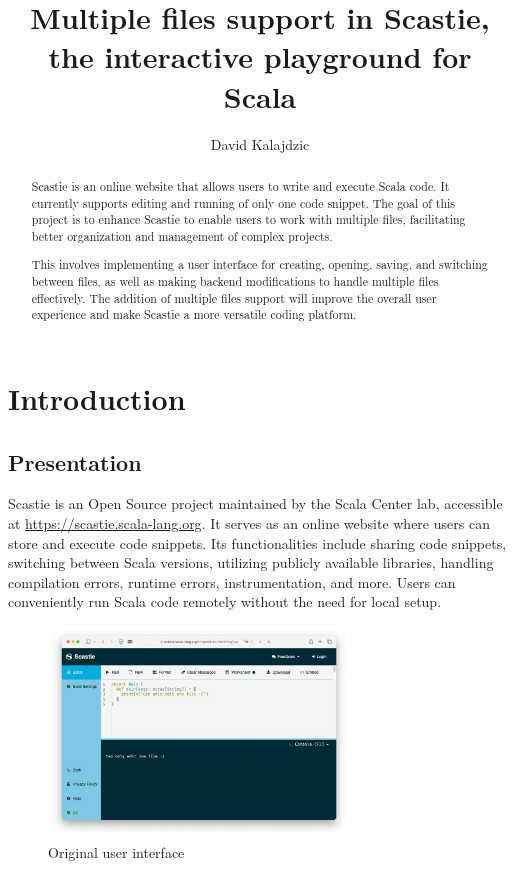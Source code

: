 \documentclass[a4paper,11pt,oneside]{report}
\title{Multiple files support in Scastie,\\the interactive playground for Scala}
\author{David Kalajdzic}
\begin{document}
\maketitle

\begin{abstract}
Scastie is an online website that allows users to write and execute Scala code. It currently supports editing and running of only one code snippet. The goal of this project is to enhance Scastie to enable users to work with multiple files, facilitating better organization and management of complex projects.

This involves implementing a user interface for creating, opening, saving, and switching between files, as well as making backend modifications to handle multiple files effectively. The addition of multiple files support will improve the overall user experience and make Scastie a more versatile coding platform.
\end{abstract}


\maketoc

\chapter{Introduction}
\section{Presentation}
Scastie is an Open Source project maintained by the Scala Center lab, accessible at \href{https://scastie.scala-lang.org}{\color{blue}https://scastie.scala-lang.org}. It serves as an online website where users can store and execute code snippets. Its functionalities include sharing code snippets, switching between Scala versions, utilizing publicly available libraries, handling compilation errors, runtime errors, instrumentation, and more. Users can conveniently run Scala code remotely without the need for local setup.

\begin{figure}[h]
\centering
\includegraphics[width=8cm]{old.jpeg}
\caption{Original user interface}
\end{figure}
\end{document}
